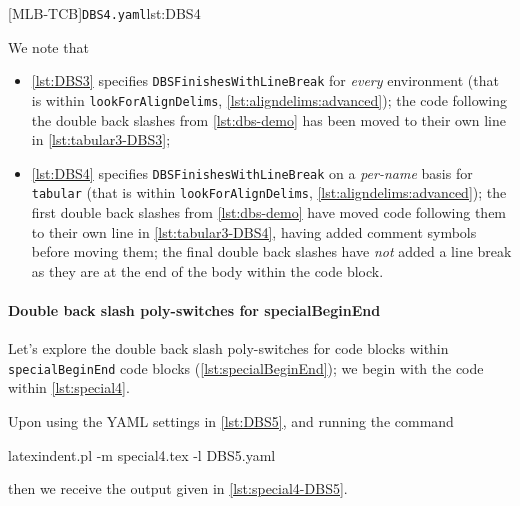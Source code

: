 		\begin{cmhtcbraster}[raster column skip=.01\linewidth]
			{\texttt{DBS4.yaml}}{lst:DBS4}
		\end{cmhtcbraster}

		We note that
		\begin{itemize}
			\item \cref{lst:DBS3} specifies \texttt{DBSFinishesWithLineBreak} for
			      \emph{every} environment (that is within \texttt{lookForAlignDelims},
			      \vref{lst:aligndelims:advanced});
			      the code following the double back slashes from \cref{lst:dbs-demo} has been moved to
			      their own line in \cref{lst:tabular3-DBS3};
			\item \cref{lst:DBS4} specifies \texttt{DBSFinishesWithLineBreak} on a
			      \emph{per-name} basis for \texttt{tabular} (that is within \texttt{lookForAlignDelims},
			      \vref{lst:aligndelims:advanced});
			      the first double back slashes from \cref{lst:dbs-demo} have moved code following them to
			      their own line in \cref{lst:tabular3-DBS4}, having added comment symbols before moving
			      them; the final double back slashes have \emph{not} added a line break as they are at the
			      end of the body within the code block.
		\end{itemize}

	\paragraph{Double back slash poly-switches for specialBeginEnd}
		Let's explore the double back slash poly-switches for code blocks within
		\texttt{specialBeginEnd} code blocks (\vref{lst:specialBeginEnd}); we begin with the code
		within \cref{lst:special4}.


		Upon using the YAML settings in \cref{lst:DBS5}, and running the command
		\begin{commandshell}
latexindent.pl -m special4.tex -l DBS5.yaml
\end{commandshell}
		then we receive the output given in \cref{lst:special4-DBS5}.

